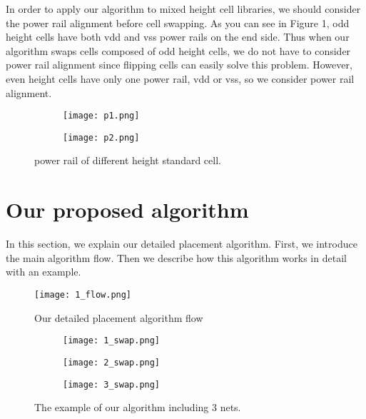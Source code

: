 \documentclass[sigconf,authordraft]{acmart}
\begin{document}
In order to apply our algorithm to mixed height cell libraries, we should consider the power rail alignment before cell swapping. As you can see in Figure 1, odd height cells have both vdd and vss power rails on the end side. Thus when our algorithm swaps cells composed of odd height cells, we do not have to consider power rail alignment since flipping cells can easily solve this problem. However, even height cells have only one power rail, vdd or vss, so we consider power rail alignment. 

\begin{figure}[h]
  \centering
\begin{subfigure}{0.2\textwidth}
\texttt{[image: p1.png]}
\end{subfigure}
\begin{subfigure}{0.2\textwidth}
\texttt{[image: p2.png]}
\end{subfigure}

\caption{power rail of different height standard cell.}
\end{figure}

\section{Our proposed algorithm}

In this section, we explain our detailed placement algorithm. First, we introduce the main algorithm flow. Then we describe how this algorithm works in detail with an example. \par
\begin{figure}[h]
  \centering
  \texttt{[image: 1\_flow.png]}
  \caption{Our detailed placement algorithm flow}
\end{figure}

\begin{figure*}[h]
  \centering
\begin{subfigure}{0.33\textwidth}
\texttt{[image: 1\_swap.png]}
\end{subfigure}
\begin{subfigure}{0.33\textwidth}
\texttt{[image: 2\_swap.png]}
\end{subfigure}
%
\begin{subfigure}{0.33\textwidth}
\texttt{[image: 3\_swap.png]}
\end{subfigure}
\caption{The example of our algorithm including 3 nets.}
\end{figure*}
\end{document}
